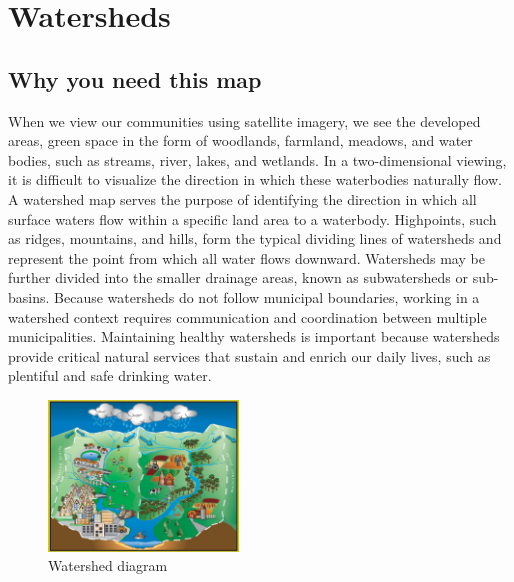 \section{Watersheds}\label{subsec:watersheds}
\subsection*{Why you need this map}
When we view our communities using satellite imagery, we see the developed 
areas, green space in the form of woodlands, farmland, meadows, and water 
bodies, such as streams, river, lakes, and wetlands. In a two-dimensional 
viewing, it is difficult to visualize the direction in which these waterbodies 
naturally flow. A watershed map serves the purpose of identifying the direction 
in which all surface waters flow within a specific land area to a waterbody. 
Highpoints, such as ridges, mountains, and hills, form the typical dividing 
lines of watersheds and represent the point from which all water flows 
downward. Watersheds may be further divided into the smaller drainage areas, 
known as subwatersheds or sub-basins. Because watersheds do not follow 
municipal boundaries, working in a watershed context requires communication and 
coordination between multiple municipalities. Maintaining healthy watersheds is 
important because watersheds provide critical natural services that sustain and 
enrich our daily lives, such as plentiful and safe drinking water.

\begin{figure}
  \centering
    \includegraphics[width=0.45\textwidth]{images/watershed_riveralliance.jpg}
  \caption{Watershed diagram}\label{fig:watershed}
  \vspace{-20pt}
\end{figure}

